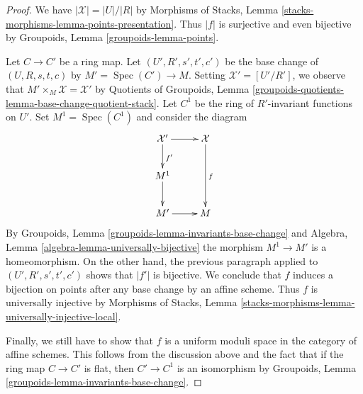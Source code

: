 \documentclass[10pt,a4paper]{amsart}
\theoremstyle{plain}
\theoremstyle{definition}
\theoremstyle{remark}
\numberwithin{equation}{subsection}
\def\Spec{\mathop{\mathrm{Spec}}}
\begin{document}
\begin{proof}
\medskip\noindent
We have $|\mathcal{X}| = |U|/|R|$ by
Morphisms of Stacks, Lemma \ref{stacks-morphisms-lemma-points-presentation}.
Thus $|f|$ is surjective and even bijective
by Groupoids, Lemma \ref{groupoids-lemma-points}.

\medskip\noindent
Let $C \to C'$ be a ring map. Let $(U', R', s', t', c')$ be
the base change of $(U, R, s, t, c)$ by $M' = \Spec(C') \to M$.
Setting $\mathcal{X}' = [U'/R']$, we observe that
$M' \times_M \mathcal{X} = \mathcal{X}'$ by
Quotients of Groupoids, Lemma
\ref{groupoids-quotients-lemma-base-change-quotient-stack}.
Let $C^1$ be the ring of $R'$-invariant functions on $U'$.
Set $M^1 = \Spec(C^1)$ and consider the diagram
$$
\xymatrix{
\mathcal{X}' \ar[d]^{f'} \ar[r] & \mathcal{X} \ar[dd]^f \\
M^1 \ar[d] \\
M' \ar[r] & M
}
$$
By Groupoids, Lemma \ref{groupoids-lemma-invariants-base-change} and
Algebra, Lemma \ref{algebra-lemma-universally-bijective}
the morphism $M^1 \to M'$ is a homeomorphism.
On the other hand, the previous paragraph applied to
$(U', R', s', t', c')$ shows that $|f'|$ is bijective.
We conclude that $f$ induces a bijection on points after any
base change by an affine scheme. Thus $f$ is universally injective
by Morphisms of Stacks, Lemma
\ref{stacks-morphisms-lemma-universally-injective-local}.

\medskip\noindent
Finally, we still have to show that $f$ is a uniform moduli space
in the category of affine schemes. This follows from the discussion
above and the fact that if the
ring map $C \to C'$ is flat, then $C' \to C^1$ is an isomorphism
by Groupoids, Lemma \ref{groupoids-lemma-invariants-base-change}.
\end{proof}
\end{document}
